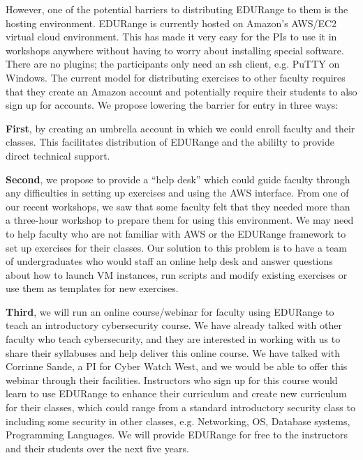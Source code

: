However, one of the potential barriers to distributing EDURange to them is the hosting environment.
EDURange is currently hosted on
Amazon's AWS/EC2 virtual cloud environment.  This has made it very easy for the PIs to use it in 
workshops anywhere without having to worry about installing special software.  There are no plugins;
the participants only need an ssh client, e.g. PuTTY on Windows.  The current 
model for distributing
exercises to other faculty requires that they create an Amazon account and potentially require their students
to also sign up for accounts.  We propose lowering the barrier for entry in three ways:

{\bf First}, by creating an umbrella account in 
which we could enroll faculty and their classes.  This facilitates distribution of EDURange
and the abililty to provide direct 
technical support.  

{\bf Second},
we propose to provide a ``help desk'' which could guide faculty through any difficulties in setting up 
exercises and using the AWS interface.  From one of our recent workshops, we saw that 
some faculty felt that they needed more than a three-hour workshop to prepare them for using this
environment.  We may need to help faculty who are not familiar with AWS or the EDURange
framework  to set up exercises 
for their classes.  Our solution to this problem is  to have a team of undergraduates who would staff 
an online help desk
and answer questions about how to launch VM instances, run scripts and modify existing exercises or use them as 
templates for new exercises.

{\bf Third}, we will run an online course/webinar for faculty using EDURange to teach an introductory cybersecurity
course.  We have already talked with other faculty who teach cybersecurity, and they are interested in 
working with us to share their syllabuses and help deliver this online course.  We have talked with 
Corrinne Sande, a PI for Cyber Watch West, and we would be able to offer this webinar through their 
facilities.
Instructors who sign up for this course would learn
to use EDURange to enhance their curriculum and create new curriculum for their classes, which could range from 
a standard introductory
security class to including some 
security in other classes, e.g. Networking, OS, Database systems, Programming Languages.
We will provide EDURange for free to the instructors and their students over the next five years.


